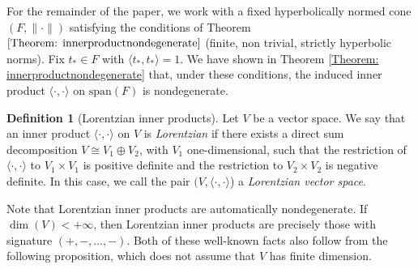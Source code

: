 \documentclass[a4paper,11pt]{article}
\numberwithin{equation}{section}
\theoremstyle{definition}
\newtheorem{Definition}{Definition}[section]
\theoremstyle{plain}
\newcommand{\spn}{\mathrm{span}}
\newcommand{\inner}[2]{\langle #1, #2 \rangle}
\newcommand{\norm}[1]{\| #1\|}
\begin{document}
For the remainder of the paper, we work with a fixed hyperbolically normed cone $(F, \norm{\cdot})$ satisfying the conditions of Theorem $\ref{Theorem: innerproductnondegenerate}$ (finite, non trivial, strictly hyperbolic norms). Fix $t_{*} \in F$ with $\inner{t_{*}}{t_{*}} = 1$. We have shown in Theorem \ref{Theorem: innerproductnondegenerate} that, under these conditions, the induced inner product $\inner{\cdot}{\cdot}$ on $\spn(F)$ is nondegenerate.

\begin{Definition}[Lorentzian inner products]\label{Definition: Lorentzianinnerproducts}
Let $V$ be a vector space. We say that an inner product $\inner{\cdot}{\cdot}$ on $V$ is \emph{Lorentzian} if there exists a direct sum decomposition $V \cong V_1 \oplus V_2$, with $V_1$ one-dimensional, such that the restriction of $\inner{\cdot}{\cdot}$ to $V_1 \times V_1$ is positive definite and the restriction to $V_2 \times V_2$ is negative definite. In this case, we call the pair $(V, \inner{\cdot}{\cdot}$) a \emph{Lorentzian vector space}.
\end{Definition}

Note that Lorentzian inner products are automatically nondegenerate. If $\dim(V) < +\infty$, then Lorentzian inner products are precisely those with signature $(+,-,\dots,-)$. Both of these well-known facts also follow from the following proposition, which does not assume that $V$ has finite dimension.
\end{document}
